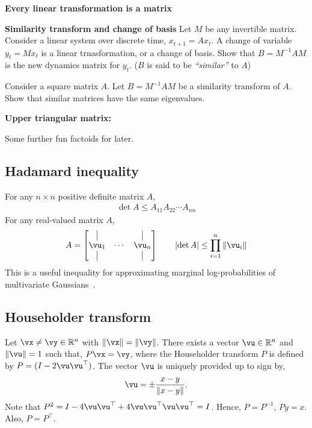 \documentclass[a4paper,11pt]{exam}
\newcounter{ct}
\newcommand{\inv}{^{-1}}
\newcommand{\tp}[1]{\ensuremath{{#1}^\top}} %
\newcommand{\norm}[1]{\ensuremath{\Vert{#1}\Vert}}
\providecommand{\abs}[1]{\lvert#1\rvert}
\newcommand{\field}[1]{\ensuremath{\mathbb{#1}}}
\newcommand{\reals}{\field{R}}
\begin{document}
\begin{questions}
\question \textbf{Every linear transformation is a matrix}

\question \textbf{Similarity transform and change of basis}
Let $M$ be any invertible matrix.
Consider a linear system over discrete time, $x_{t+1} = Ax_t$.
A change of variable $y_t = Mx_t$ is a linear trnasformation, or a change of basis.
Show that $B = M\inv A M$ is the new dynamics matrix for $y_t$.
($B$ is said to be \textit{``similar''} to $A$)

\question Consider a square matrix $A$. Let $B = M\inv A M$ be a similarity transform of $A$.
Show that similar matrices have the same eigenvalues.

\question \textbf{Upper triangular matrix:}

\end{questions}

Some further fun factoids for later.
\subsection{Hadamard inequality}
For any $n \times n$ positive definite matrix $A$,
\begin{align}
    \det{A} \leq A_{11} A_{22} \cdots A_{nn}
\end{align}
For any real-valued matrix $A$,
\begin{align}
    A = 
    \begin{bmatrix}
	\kern.3em\vline\kern.3em
	&
	&
	\kern.3em\vline\kern.3em
	\\
	\vu_1 & \cdots & \vu_n \\
	\kern.3em\vline\kern.3em
	&
	&
	\kern.3em\vline\kern.3em
    \end{bmatrix}
    \qquad
    \abs{\det{A}} \leq \prod_{i=1}^n \norm{\vu_i}
\end{align}
This is a useful inequality for approximating marginal log-probabilities of multivariate Gaussians~\citep{Zhang2013a}.
\subsection{Householder transform}
Let $\vx \neq \vy \in \reals^n$ with $\norm{\vx} = \norm{\vy}$.
There exists a vector $\vu \in \reals^n$ and $\norm{\vu} = 1$ such that, $P\vx = \vy$,
where the Householder transform $P$ is defined by $P = (I - 2\vu\tp{\vu})$.
The vector $\vu$ is uniquely provided up to sign by,
\[
    \vu = \pm \frac{x-y}{\norm{x-y}}.
\]
Note that $P^2 = I - 4\vu\tp{\vu} + 4\vu\tp{\vu}\vu\tp{\vu} = I$.
Hence, $P = P\inv$, $Py = x$. Also, $P = \tp{P}$.
\end{document}
